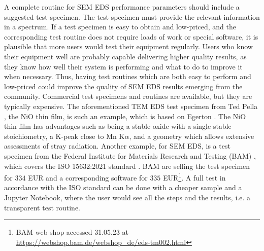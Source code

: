 A complete routine for SEM EDS performance parameters should include a suggested test specimen.
The test specimen must provide the relevant information in a spectrum.
If a test specimen is easy to obtain and low-priced, and the corresponding test routine does not require loads of work or special software, it is plausible that more users would test their equipment regularly.
Users who know their equipment well are probably capable delivering higher quality results, as they know how well their system is performing and what to do to improve it when necessary.
Thus, having test routines which are both easy to perform and low-priced could improve the quality of SEM EDS results emerging from the community.
Commercial test specimens and routines are available, but they are typically expensive.
The aforementioned TEM EDS test specimen from Ted Pella \cite{ted_pella_nio_tem_2019}, the NiO thin film, is such an example, which is based on Egerton \cite{egerton_nio_characterization_1994}.
The NiO thin film has advantages such as being a stable oxide with a single stable stoichiometry, a K-peak close to Mn K$\alpha$, and a geometry which allows extensive assessments of stray radiation.
Another example, for SEM EDS, is a test specimen from the Federal Institute for Materials Research and Testing (BAM) \cite{rackwitz_2015_bam}, which covers the ISO 15632:2021 standard \cite{iso_qc_15632}.
BAM are selling the test specimen for  $334$ EUR and a corresponding software for $335$ EUR\footnote{BAM web shop accessed 31.05.23 at \url{https://webshop.bam.de/webshop_de/eds-tm002.html}}.
A full test in accordance with the ISO standard can be done with a cheaper sample and a Jupyter Notebook, where the user would see all the steps and the results, i.e. a transparent test routine.

